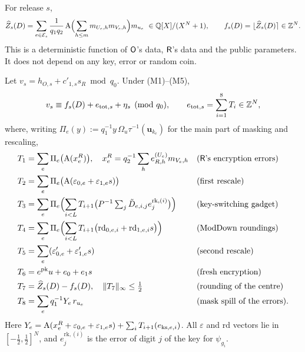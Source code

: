 \begin{definition}\label{def:centre}
For release $s$,
\[
  \widehat Z_s(D)=\sum_{e\in\mathcal E_s}\frac{1}{q_1q_2}\,\mathrm{A}\Bigl(\sum_{h\le m}m_{U_e,h}m_{V_e,h}\Bigr)m_{u_e}\ \in\mathbb{Q}[X]/(X^N+1),
  \qquad f_s(D)=\lfloor\widehat Z_s(D)\rceil\in\mathbb{Z}^N .
\]
This is a deterministic function of $\mathsf{O}$'s data, $\mathsf{R}$'s data and the public parameters. It does not depend on any key, error or random coin.
\end{definition}

\begin{proposition}\label{prop:decomp}
Let $v_s=h_{O,s}+c'_{1,s}s_R\bmod q_0$. Under (M1)--(M5),
\[
  v_s\equiv f_s(D)+e_{\mathrm{tot},s}+\eta_s\pmod{q_0},\qquad e_{\mathrm{tot},s}=\sum_{i=1}^8T_i\in\mathbb{Z}^N,
\]
where, writing $\Pi_e(y):=q_1^{-1}y\,\Omega_u\tau^{-1}(\mathbf u_{k_e})$ for the main part of masking and rescaling,
\begin{align*}
  T_1&=\sum_e\Pi_e\bigl(\mathrm{A}(x^R_e)\bigr),\quad x^R_e=q_2^{-1}\sum_he^{(U_e)}_{R,h}m_{V_e,h} &&\text{($\mathsf{R}$'s encryption errors)}\\
  T_2&=\sum_e\Pi_e\bigl(\mathrm{A}(\varepsilon_{0,e}+\varepsilon_{1,e}s)\bigr) &&\text{(first rescale)}\\
  T_3&=\sum_e\Pi_e\Bigl(\sum_{i<L}T_{i+1}\bigl(P^{-1}\textstyle\sum_j\tilde D_{e,i,j}e^{\mathrm{rk},(i)}_j\bigr)\Bigr) &&\text{(key-switching gadget)}\\
  T_4&=\sum_e\Pi_e\Bigl(\sum_{i<L}T_{i+1}\bigl(\mathrm{rd}_{0,e,i}+\mathrm{rd}_{1,e,i}s\bigr)\Bigr) &&\text{(ModDown roundings)}\\
  T_5&=\sum_e(\varepsilon'_{0,e}+\varepsilon'_{1,e}s) &&\text{(second rescale)}\\
  T_6&=e^{\mathrm{pk}}u+e_0+e_1s &&\text{(fresh encryption)}\\
  T_7&=\widehat Z_s(D)-f_s(D),\quad\lVert T_7\rVert_\infty\le\tfrac12 &&\text{(rounding of the centre)}\\
  T_8&=\sum_eq_1^{-1}Y_e\,r_{u_e} &&\text{(mask spill of the errors)}.
\end{align*}
Here $Y_e=\mathrm{A}(x^R_e+\varepsilon_{0,e}+\varepsilon_{1,e}s)+\sum_iT_{i+1}(e_{\mathrm{ks},e,i})$. All $\varepsilon$ and $\mathrm{rd}$ vectors lie in $[-\frac12,\frac12]^N$, and $e^{\mathrm{rk},(i)}_j$ is the error of digit $j$ of the key for $\psi_{g_i}$.
\end{proposition}
